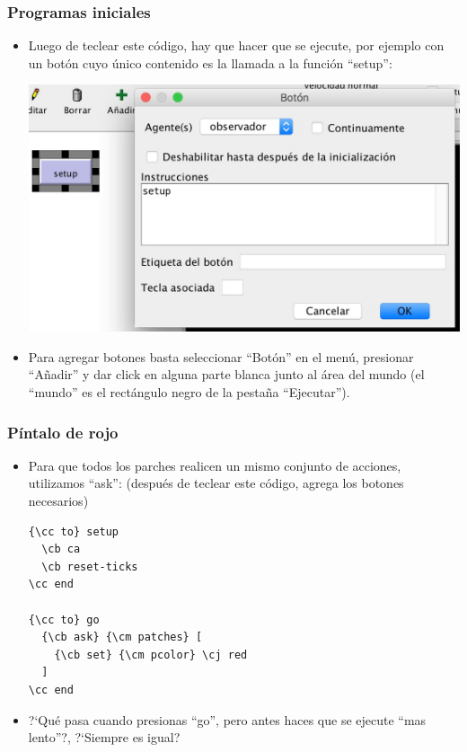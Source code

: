 \documentclass{beamer}
\begin{document}
\begin{frame}[t]
\frametitle{Programas iniciales}
\begin{itemize}[<+->]
	\item Luego de teclear este código, hay que hacer que se ejecute, por ejemplo con un botón cuyo único contenido es la llamada a la función ``setup'':
	\begin{center}{\includegraphics[width=.5\textwidth]{setup}}\end{center}
	\item Para agregar botones basta seleccionar ``Botón'' en el menú, presionar ``Añadir'' y dar click en alguna parte blanca junto al área del mundo (el ``mundo'' es el rectángulo negro de la pestaña ``Ejecutar'').
\end{itemize}
\end{frame}

\newcommand{\cb}{\color{blue}}
\newcommand{\cc}{\color{cyan}}
\newcommand{\cm}{\color{magenta}}
\newcommand{\cj}{\color{red}}

\begin{frame}[fragile]
\frametitle{Píntalo de rojo}
\begin{itemize}[<+->]
	\item Para que todos los parches realicen un mismo conjunto de acciones, utilizamos ``ask'': (después de teclear este código, agrega los botones necesarios)
	\begin{Verbatim}[commandchars=\\\{\}]
{\cc to} setup
  \cb ca
  \cb reset-ticks
\cc end

{\cc to} go
  {\cb ask} {\cm patches} [
    {\cb set} {\cm pcolor} \cj red
  ]
\cc end
\end{Verbatim}
\item ?`Qué pasa cuando presionas ``go'', pero antes haces que se ejecute ``mas lento''?, ?`Siempre es igual?
\end{itemize}
\end{frame}
\end{document}
